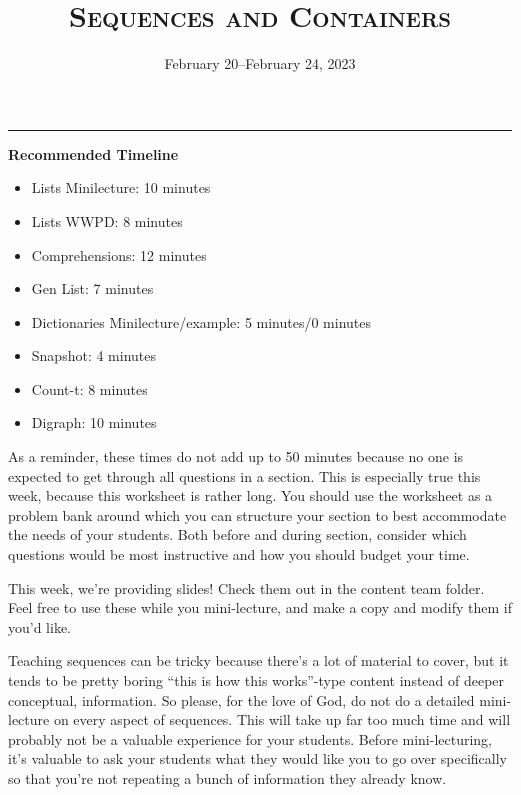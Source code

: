 \documentclass{exam}
\title{\textsc{Sequences and Containers}}
\date{February 20--February 24, 2023}
\begin{document}
\maketitle
\rule{\textwidth}{0.15em}


\begin{meta}
    \textbf{Recommended Timeline}
    \begin{itemize}
        \item Lists Minilecture: 10 minutes
        \item Lists WWPD: 8 minutes
        \item Comprehensions: 12 minutes
        \item Gen List: 7 minutes
        \item Dictionaries Minilecture/example: 5 minutes/0 minutes
        \item Snapshot: 4 minutes
        \item Count-t: 8 minutes
        \item Digraph: 10 minutes
    \end{itemize}

    As a reminder, these times do not add up to 50 minutes because no one is expected 
    to get through all questions in a section. This is especially true this week, 
    because this worksheet is rather long. You should use the worksheet as a problem bank
     around which you can structure your section to best accommodate the needs of your 
     students. Both before and during section, consider which questions would be most 
     instructive and how you should budget your time.

    This week, we're providing slides! Check them out in the content team folder. 
    Feel free to use these while you mini-lecture, and make a copy and modify them 
    if you'd like. 

    Teaching sequences can be tricky because there's a lot of material to cover, but 
    it tends to be pretty boring ``this is how this works''-type content instead of 
    deeper conceptual, information. So please, for the love of God, do not do a detailed 
    mini-lecture on every aspect of sequences. This will take up far too much time and 
    will probably not be a valuable experience for your students. Before mini-lecturing, 
    it's valuable to ask your students what they would like you to go over specifically 
    so that you're not repeating a bunch of information they already know. 
\end{meta}
\end{document}
